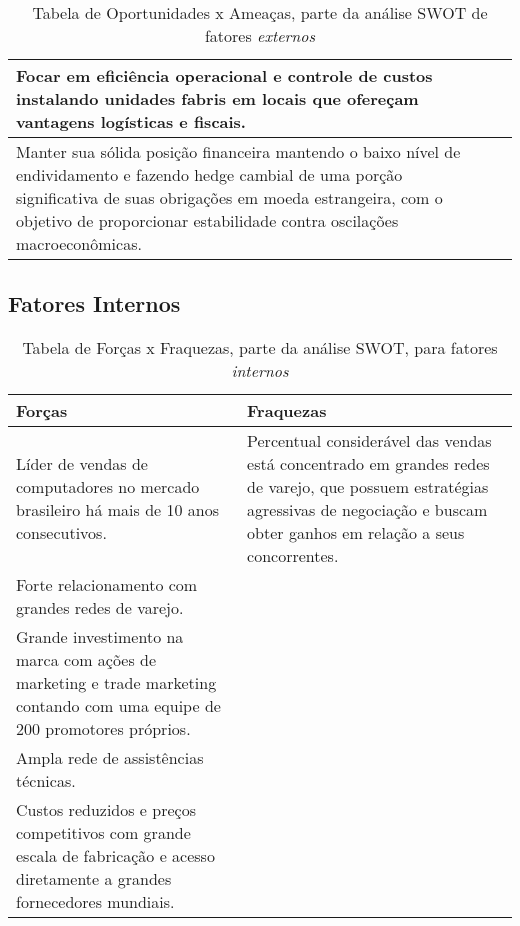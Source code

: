 {{{{\begin{center}
\begin{table}[H]
\begin{centering}
\begin{tabular}{>{\centering}p{}|>{\centering}p{}}
\hline 
Focar em eficiência operacional e controle de custos instalando unidades
fabris em locais que ofereçam vantagens logísticas e fiscais.  & \tabularnewline
\hline 
Manter sua sólida posição financeira mantendo o baixo nível de endividamento
e fazendo hedge cambial de uma porção significativa de suas obrigações
em moeda estrangeira, com o objetivo de proporcionar estabilidade
contra oscilações macroeconômicas.  & \tabularnewline
\hline 
\end{tabular}
\par\end{centering}
\caption{Tabela de Oportunidades x Ameaças, parte da análise SWOT de fatores \emph{externos}}
\end{table}
\par\end{center}

\subsection {Fatores Internos}

\begin{center}
\begin{table}[H]
\begin{centering}
\begin{tabular}{>{\centering}p{}|>{\centering}p{}}
\hline
Forças & Fraquezas\tabularnewline
\hline
Líder de vendas de computadores no mercado brasileiro há mais de 10
anos consecutivos.  & Percentual considerável das vendas está concentrado em grandes redes
de varejo, que possuem estratégias agressivas de negociação e buscam
obter ganhos em relação a seus concorrentes.\tabularnewline
\hline
Forte relacionamento com grandes redes de varejo.  & \tabularnewline
\hline
Grande investimento na marca com ações de marketing e trade marketing
contando com uma equipe de 200 promotores próprios.  & \tabularnewline
\hline
Ampla rede de assistências técnicas.  & \tabularnewline
\hline
Custos reduzidos e preços competitivos com grande escala de fabricação
e acesso diretamente a grandes fornecedores mundiais.  & \tabularnewline
\hline
\end{tabular}
\par\end{centering}
\caption{Tabela de Forças x Fraquezas, parte da análise SWOT, para fatores
\emph{internos}}
\end{table}
\par\end{center}

}}}}
